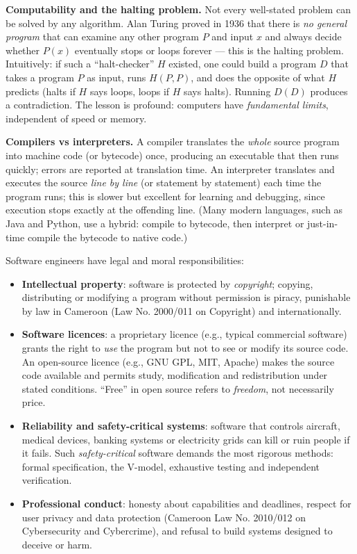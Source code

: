 \documentclass[11pt]{article}
\newcommand{\cle}[1]{{\popxbold\color{popdark}#1}}
\newcounter{popsec}
\newcounter{popsub}
\newcommand{\courssub}[1]{%
  \stepcounter{popsub}%
  \par\vspace{9pt}\noindent{\popxbold\fontsize{11.5}{13}\selectfont\color{popink}{\color{poporange}\thepopsec.\thepopsub}\hspace{6pt}#1}\par\nopagebreak\vspace{4pt}
}
\begin{document}
\textbf{Computability and the halting problem.} Not every well-stated problem can be solved by any algorithm. Alan Turing proved in 1936 that there is \emph{no general program} that can examine any other program $P$ and input $x$ and always decide whether $P(x)$ eventually stops or loops forever — this is the \cle{halting problem}. Intuitively: if such a ``halt-checker'' $H$ existed, one could build a program $D$ that takes a program $P$ as input, runs $H(P,P)$, and does the opposite of what $H$ predicts (halts if $H$ says loops, loops if $H$ says halts). Running $D(D)$ produces a contradiction. The lesson is profound: computers have \emph{fundamental limits}, independent of speed or memory.

\textbf{Compilers vs interpreters.} A \cle{compiler} translates the \emph{whole} source program into machine code (or bytecode) once, producing an executable that then runs quickly; errors are reported at translation time. An \cle{interpreter} translates and executes the source \emph{line by line} (or statement by statement) each time the program runs; this is slower but excellent for learning and debugging, since execution stops exactly at the offending line. (Many modern languages, such as Java and Python, use a hybrid: compile to bytecode, then interpret or just-in-time compile the bytecode to native code.)

\courssub{Professional and Ethical Issues}

Software engineers have legal and moral responsibilities:

\begin{itemize}
\item \textbf{Intellectual property}: software is protected by \emph{copyright}; copying, distributing or modifying a program without permission is piracy, punishable by law in Cameroon (Law No. 2000/011 on Copyright) and internationally.
\item \textbf{Software licences}: a \cle{proprietary licence} (e.g., typical commercial software) grants the right to \emph{use} the program but not to see or modify its source code. An \cle{open-source licence} (e.g., GNU GPL, MIT, Apache) makes the source code available and permits study, modification and redistribution under stated conditions. ``Free'' in open source refers to \emph{freedom}, not necessarily price.
\item \textbf{Reliability and safety-critical systems}: software that controls aircraft, medical devices, banking systems or electricity grids can kill or ruin people if it fails. Such \emph{safety-critical} software demands the most rigorous methods: formal specification, the V-model, exhaustive testing and independent verification.
\item \textbf{Professional conduct}: honesty about capabilities and deadlines, respect for user privacy and data protection (Cameroon Law No. 2010/012 on Cybersecurity and Cybercrime), and refusal to build systems designed to deceive or harm.
\end{itemize}
\end{document}
